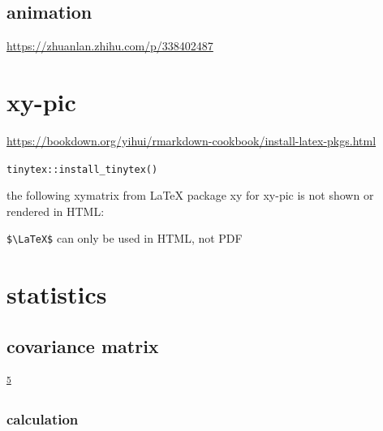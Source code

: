 \documentclass[
]{book}
\theoremstyle{definition}
\theoremstyle{definition}
\theoremstyle{definition}
\theoremstyle{definition}
\theoremstyle{remark}
\begin{document}
\hypertarget{animation}{%
\section{animation}\label{animation}}

\url{https://zhuanlan.zhihu.com/p/338402487}

\hypertarget{xy-pic}{%
\chapter{xy-pic}\label{xy-pic}}

\url{https://bookdown.org/yihui/rmarkdown-cookbook/install-latex-pkgs.html}

\texttt{tinytex::install\_tinytex()}

the following xymatrix from LaTeX package xy for xy-pic is not shown or rendered in HTML:

\texttt{\$\textbackslash{}LaTeX\$} can only be used in HTML, not PDF


\hypertarget{statistics}{%
\chapter{statistics}\label{statistics}}

\hypertarget{covariance-matrix}{%
\section{covariance matrix}\label{covariance-matrix}}

\textsuperscript{\protect\hyperlink{ref-ccjou2014}{5}}

\hypertarget{calculation}{%
\subsection{calculation}\label{calculation}}
\end{document}
